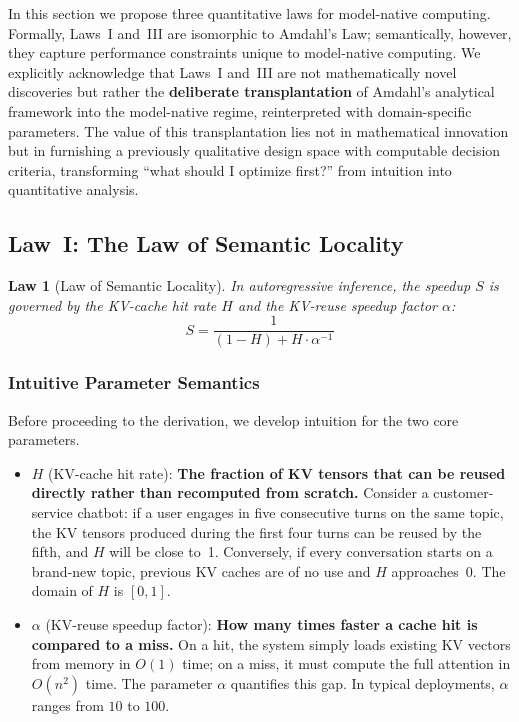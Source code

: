 \documentclass[11pt,a4paper]{article}
\newtheorem{law}{Law}[section]
\begin{document}
In this section we propose three quantitative laws for model-native computing. Formally, Laws~I and~III are isomorphic to Amdahl's Law; semantically, however, they capture performance constraints unique to model-native computing. We explicitly acknowledge that Laws~I and~III are not mathematically novel discoveries but rather the \textbf{deliberate transplantation} of Amdahl's analytical framework into the model-native regime, reinterpreted with domain-specific parameters. The value of this transplantation lies not in mathematical innovation but in furnishing a previously qualitative design space with computable decision criteria, transforming ``what should I optimize first?'' from intuition into quantitative analysis.

\subsection{Law~I: The Law of Semantic Locality}
\label{sec:law1}

\begin{law}[Law of Semantic Locality]
In autoregressive inference, the speedup $S$ is governed by the KV-cache hit rate $H$ and the KV-reuse speedup factor $\alpha$:
\begin{equation}
\label{eq:locality}
S = \frac{1}{(1-H) + H \cdot \alpha^{-1}}
\end{equation}
\end{law}

\subsubsection{Intuitive Parameter Semantics}

Before proceeding to the derivation, we develop intuition for the two core parameters.

\begin{itemize}[nosep]
\item $H$ (KV-cache hit rate): \textbf{The fraction of KV tensors that can be reused directly rather than recomputed from scratch.} Consider a customer-service chatbot: if a user engages in five consecutive turns on the same topic, the KV tensors produced during the first four turns can be reused by the fifth, and $H$ will be close to~1. Conversely, if every conversation starts on a brand-new topic, previous KV caches are of no use and $H$ approaches~0. The domain of $H$ is $[0, 1]$.

\item $\alpha$ (KV-reuse speedup factor): \textbf{How many times faster a cache hit is compared to a miss.} On a hit, the system simply loads existing KV vectors from memory in $O(1)$ time; on a miss, it must compute the full attention in $O(n^{2})$ time. The parameter $\alpha$ quantifies this gap. In typical deployments, $\alpha$ ranges from $10$ to $100$.
\end{itemize}
\end{document}
